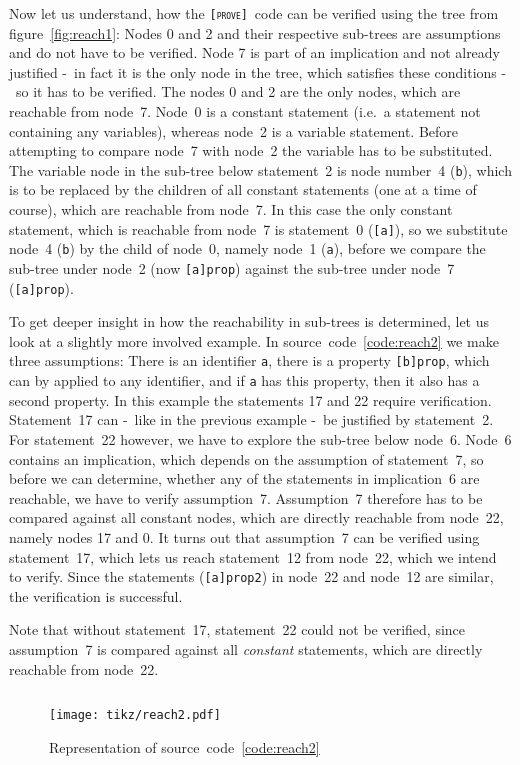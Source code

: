 \documentclass[british]{article}
\newenvironment{code}{\captionsetup{type=listing}}{}
\newcommand\prv{bc}
\newcommand\m[1]{\texttt{#1}}
\newcommand\name{\texttt{\textsc{[prove]}}}
\begin{document}
Now let us understand, how the \name\ code can be verified using the tree from
figure~\ref{fig:reach1}: Nodes 0 and 2 and their respective sub-trees are
assumptions and do not have to be verified. Node 7 is part of an implication
and not already justified -\ in fact it is the only node in the tree, which
satisfies these conditions -\ so it has to be verified. The nodes 0 and 2 are
the only nodes, which are reachable from node~7. Node~0 is a constant statement
(i.e.\ a statement not containing any variables), whereas node~2 is a variable
statement. Before attempting to compare node~7 with node~2 the variable has to
be substituted. The variable node in the sub-tree below statement~2 is node
number~4 (\m{b}), which is to be replaced by the children of all constant
statements (one at a time of course), which are reachable from node~7. In this
case the only constant statement, which is reachable from node~7 is statement~0
(\m{[a]}), so we substitute node~4 (\m{b}) by the child of node~0, namely node~1
(\m{a}), before we compare the sub-tree under node~2 (now \m{[a]prop}) against
the sub-tree under node~7 (\m{[a]prop}).
\newline

To get deeper insight in how the reachability in sub-trees is determined, let us
look at a slightly more involved example. In source~code~\ref{code:reach2} we
make three assumptions: There is an identifier \m{a}, there is a property
\m{[b]prop}, which can by applied to any identifier, and if \m{a} has this
property, then it also has a second property. In this example the statements 17
and 22 require verification. Statement~17 can -\ like in the previous example -\
be justified by statement~2. For statement~22 however, we have to explore the
sub-tree below node~6. Node~6 contains an implication, which depends on the
assumption of statement~7, so before we can determine, whether any of the
statements in implication~6 are reachable, we have to verify assumption~7.
Assumption~7 therefore has to be compared against all constant nodes, which are
directly reachable from node~22, namely nodes 17 and 0. It turns out that
assumption~7 can be verified using statement~17, which lets us reach
statement~12 from node~22, which we intend to verify. Since the statements
(\m{[a]prop2}) in node~22 and node~12 are similar, the verification is
successful.

Note that without statement~17, statement~22 could not be verified, since
assumption~7 is compared against all \emph{constant} statements, which are
directly reachable from node~22.
\pagebreak{}

\begin{code}
\label{code:reach2}
\inputminted[linenos]{\prv}{examples/reach2.prove}
\end{code}

\begin{figure}[!h]
\caption{Representation of source~code~\ref{code:reach2}}\label{fig:reach2}
\centering
\texttt{[image: tikz/reach2.pdf]}
\end{figure}

\pagebreak{}

\begingroup
{}
\setlength\bibitemsep{10pt}
\printbibliography\
\endgroup
\end{document}
